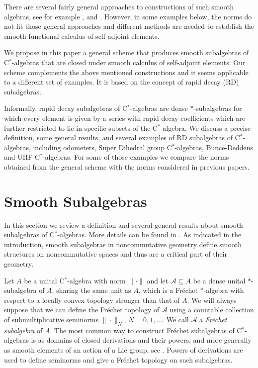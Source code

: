 \documentclass[12pt,reqno]{amsart}
\numberwithin{equation}{section}
\begin{document}
There are several fairly general approaches to  constructions of such smooth algebras, see for example \cite{BC},  \cite{KS} and \cite{BIO}.  However, in some examples below, the norms do not fit those general approaches and different methods are needed to establish the smooth functional calculus of self-adjoint elements.

We propose in this paper a general scheme that produces smooth subalgebras of C$^*$-algebras that are closed under smooth calculus of self-adjoint elements. Our scheme complements the above mentioned constructions and it seems applicable to a different set of examples. It is based on the concept of rapid decay (RD) subalgebras.

Informally, rapid decay subalgebras of C$^*$-algebras are dense $*$-subalgebras for which every element is given by a series with rapid decay coefficients which are further restricted to lie in specific subsets of the C$^*$-algebra. We discuss a precise definition, some general results, and several examples of RD subalgebras of C$^*$-algebras, including odometers, Super Dihedral group C$^*$-algebras, Bunce-Deddens and UHF C$^*$-algebras. For some of those examples we compare the norms obtained from the general scheme with the norms considered in previous papers.

\section{Smooth Subalgebras}

In this section we review a definition and several general results about smooth subalgebras of C$^*$-algebras. More details can be found in \cite{HKM1}. As indicated in the introduction, smooth subalgebras in noncommutative geometry define smooth structures on noncommutative spaces and thus are a critical part of their geometry.

Let $A$ be a unital C$^*$-algebra with norm $\|\cdot\|$ and let  $\mathcal{A}\subseteq A$
be a dense unital $*$-subalgebra of $A$, sharing the same unit as $A$, which is a Fr\'echet $*$-algebra with respect to a locally convex topology stronger than that of $A$. We will always suppose that we can define the Fr\'echet topology of $\mathcal{A}$ using a countable collection of submultiplicative seminorms $\|\cdot\|_N$, $N=0,1,\ldots$. We call $\mathcal{A}$ a {\it Fr\'echet subalgebra} of $A$. The most common way to construct Fr\'echet subalgebras of C$^*$-algebras is as domains of closed derivations and their powers, and more generally as smooth elements of an action of a Lie group, see \cite{Bo}. Powers of derivations are used to define seminorms and give a Fr\'echet topology on such subalgebras.
\end{document}
